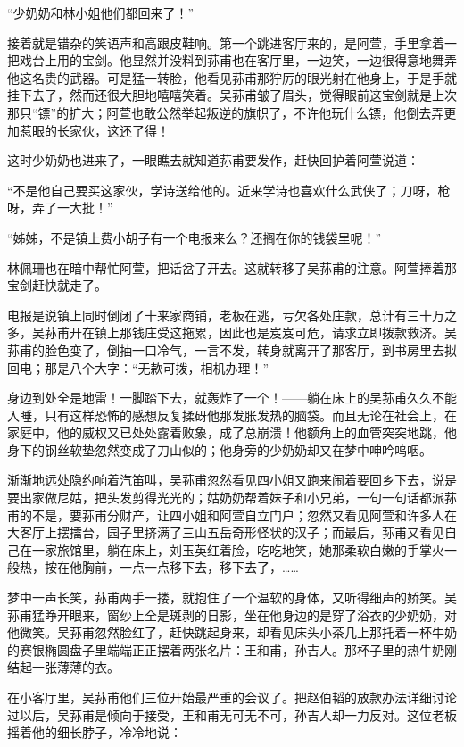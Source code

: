 \par “少奶奶和林小姐他们都回来了！”
\par 接着就是错杂的笑语声和高跟皮鞋响。第一个跳进客厅来的，是阿萱，手里拿着一把戏台上用的宝剑。他显然并没料到荪甫也在客厅里，一边笑，一边很得意地舞弄他这名贵的武器。可是猛一转脸，他看见荪甫那狞厉的眼光射在他身上，于是手就挂下去了，然而还很大胆地嘻嘻笑着。吴荪甫皱了眉头，觉得眼前这宝剑就是上次那只“镖”的扩大；阿萱也敢公然举起叛逆的旗帜了，不许他玩什么镖，他倒去弄更加惹眼的长家伙，这还了得！
\par 这时少奶奶也进来了，一眼瞧去就知道荪甫要发作，赶快回护着阿萱说道：
\par “不是他自己要买这家伙，学诗送给他的。近来学诗也喜欢什么武侠了；刀呀，枪呀，弄了一大批！”
\par “姊姊，不是镇上费小胡子有一个电报来么？还搁在你的钱袋里呢！”
\par 林佩珊也在暗中帮忙阿萱，把话岔了开去。这就转移了吴荪甫的注意。阿萱捧着那宝剑赶快就走了。
\par 电报是说镇上同时倒闭了十来家商铺，老板在逃，亏欠各处庄款，总计有三十万之多，吴荪甫开在镇上那钱庄受这拖累，因此也是岌岌可危，请求立即拨款救济。吴荪甫的脸色变了，倒抽一口冷气，一言不发，转身就离开了那客厅，到书房里去拟回电；那是八个大字：“无款可拨，相机办理！”
\par 身边到处全是地雷！一脚踏下去，就轰炸了一个！——躺在床上的吴荪甫久久不能入睡，只有这样恐怖的感想反复揉砑他那发胀发热的脑袋。而且无论在社会上，在家庭中，他的威权又已处处露着败象，成了总崩溃！他额角上的血管突突地跳，他身下的钢丝软垫忽然变成了刀山似的；他身旁的少奶奶却又在梦中呻吟呜咽。
\par 渐渐地远处隐约响着汽笛叫，吴荪甫忽然看见四小姐又跑来闹着要回乡下去，说是要出家做尼姑，把头发剪得光光的；姑奶奶帮着妹子和小兄弟，一句一句话都派荪甫的不是，要荪甫分财产，让四小姐和阿萱自立门户；忽然又看见阿萱和许多人在大客厅上摆擂台，园子里挤满了三山五岳奇形怪状的汉子；而最后，荪甫又看见自己在一家旅馆里，躺在床上，刘玉英红着脸，吃吃地笑，她那柔软白嫩的手掌火一般热，按在他胸前，一点一点移下去，移下去了，……
\par 梦中一声长笑，荪甫两手一搂，就抱住了一个温软的身体，又听得细声的娇笑。吴荪甫猛睁开眼来，窗纱上全是斑剥的日影，坐在他身边的是穿了浴衣的少奶奶，对他微笑。吴荪甫忽然脸红了，赶快跳起身来，却看见床头小茶几上那托着一杯牛奶的赛银椭圆盘子里端端正正摆着两张名片：王和甫，孙吉人。那杯子里的热牛奶刚结起一张薄薄的衣。
\par 在小客厅里，吴荪甫他们三位开始最严重的会议了。把赵伯韬的放款办法详细讨论过以后，吴荪甫是倾向于接受，王和甫无可无不可，孙吉人却一力反对。这位老板摇着他的细长脖子，冷冷地说：
